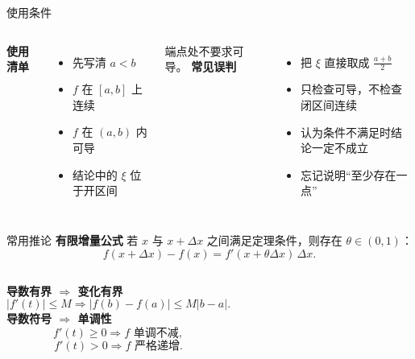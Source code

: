\documentclass[aspectratio=169,11pt]{beamer}
\begin{document}
\begin{frame}{使用条件}
  \begin{columns}[T,onlytextwidth]
      \textbf{使用清单}
      \vspace{2mm}
      \begin{itemize}
        \item[$\checkmark$] 先写清 $a<b$
        \item[$\checkmark$] $f$ 在 $[a,b]$ 上连续
        \item[$\checkmark$] $f$ 在 $(a,b)$ 内可导
        \item[$\checkmark$] 结论中的 $\xi$ 位于开区间
      \end{itemize}
      \vspace{2mm}
      \textcolor{LessonTeal}{端点处不要求可导。}
      \textbf{常见误判}
      \vspace{2mm}
      \begin{itemize}
        \item[\textcolor{LessonBad}{$\times$}] 把 $\xi$ 直接取成 $\frac{a+b}{2}$
        \item[\textcolor{LessonBad}{$\times$}] 只检查可导，不检查闭区间连续
        \item[\textcolor{LessonBad}{$\times$}] 认为条件不满足时结论一定不成立
        \item[\textcolor{LessonBad}{$\times$}] 忘记说明“至少存在一点”
      \end{itemize}
  \end{columns}
  \vfill
\end{frame}

\begin{frame}{常用推论}
  \textbf{有限增量公式}\hfill
  若 $x$ 与 $x+\Delta x$ 之间满足定理条件，则存在 $\theta\in(0,1)$：
  \[
    \boxed{f(x+\Delta x)-f(x)=f'(x+\theta\Delta x)\,\Delta x}.
  \]
  \vspace{1mm}
  \begin{columns}[T,onlytextwidth]
      \textbf{导数有界 $\Rightarrow$ 变化有界}
      \[
        |f'(t)|\le M
        \Longrightarrow
        |f(b)-f(a)|\le M|b-a|.
      \]
      \textbf{导数符号 $\Rightarrow$ 单调性}
      \[
        f'(t)\ge 0\Rightarrow f\text{ 单调不减},
      \]
      \[
        f'(t)>0\Rightarrow f\text{ 严格递增}.
      \]
  \end{columns}
  \vfill
\end{frame}
\end{document}
